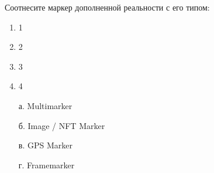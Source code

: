 
Соотнесите маркер дополненной реальности с его типом:


\begin{multicols}{2}
    {
        \begin{enumerate}
            \item 1
            \item 2
            \item 3
            \item 4
        \end{enumerate}
    }    
    {
        \begin{enumerate}
            \item[а.] Multimarker
            \item[б.] Image / NFT Marker
            \item[в.] GPS Marker
            \item[г.] Framemarker
        \end{enumerate}
    }
\end{multicols}